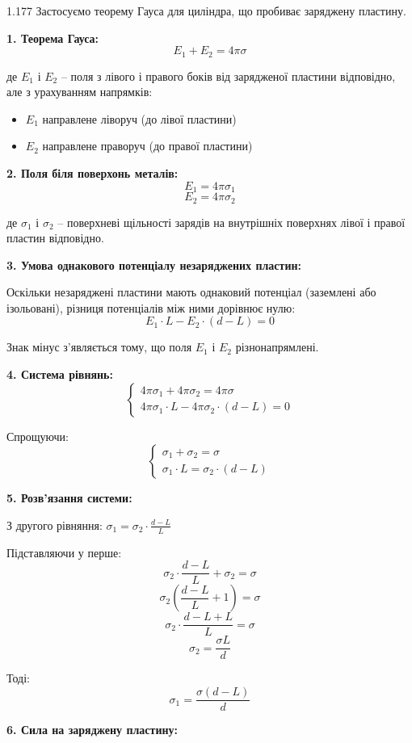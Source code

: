 \begin{Solution}{1.{177}}
Застосуємо теорему Гауса для циліндра, що пробиває заряджену пластину.

\textbf{1. Теорема Гауса:}
$$E_1 + E_2 = 4\pi\sigma$$

де $E_1$ і $E_2$ -- поля з лівого і правого боків від зарядженої пластини відповідно, але з урахуванням напрямків:
\begin{itemize}
    \item $E_1$ направлене ліворуч (до лівої пластини)
    \item $E_2$ направлене праворуч (до правої пластини)
\end{itemize}

\textbf{2. Поля біля поверхонь металів:}
$$E_1 = 4\pi\sigma_1$$
$$E_2 = 4\pi\sigma_2$$

де $\sigma_1$ і $\sigma_2$ -- поверхневі щільності зарядів на внутрішніх поверхнях лівої і правої пластин відповідно.

\textbf{3. Умова однакового потенціалу незаряджених пластин:}

Оскільки незаряджені пластини мають однаковий потенціал (заземлені або ізольовані), різниця потенціалів між ними дорівнює нулю:
$$E_1 \cdot L - E_2 \cdot (d-L) = 0$$

Знак мінус з'являється тому, що поля $E_1$ і $E_2$ різнонапрямлені.

\textbf{4. Система рівнянь:}
$$\begin{cases}
4\pi\sigma_1 + 4\pi\sigma_2 = 4\pi\sigma \\
4\pi\sigma_1 \cdot L - 4\pi\sigma_2 \cdot (d-L) = 0
\end{cases}$$

Спрощуючи:
$$\begin{cases}
\sigma_1 + \sigma_2 = \sigma \\
\sigma_1 \cdot L = \sigma_2 \cdot (d-L)
\end{cases}$$

\textbf{5. Розв'язання системи:}

З другого рівняння: $\sigma_1 = \sigma_2 \cdot \frac{d-L}{L}$

Підставляючи у перше:
$$\sigma_2 \cdot \frac{d-L}{L} + \sigma_2 = \sigma$$
$$\sigma_2 \left(\frac{d-L}{L} + 1\right) = \sigma$$
$$\sigma_2 \cdot \frac{d-L+L}{L} = \sigma$$
$$\sigma_2 = \frac{\sigma L}{d}$$

Тоді:
$$\sigma_1 = \frac{\sigma(d-L)}{d}$$

\textbf{6. Сила на заряджену пластину:}


\end{Solution}
